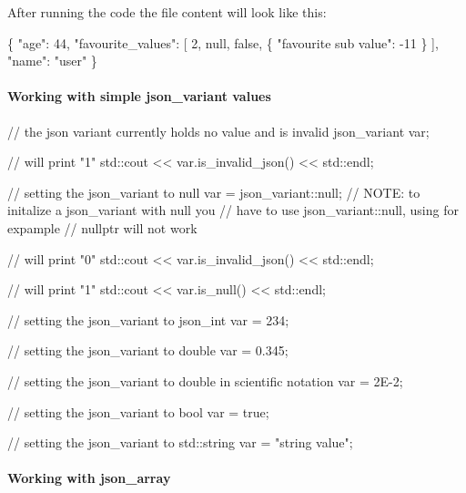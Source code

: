 After running the code the file content will look like this\+: 
\begin{DoxyCode}
\{
    "age": 44,
    "favourite\_values": [
        2,
        null,
        false,
        \{
            "favourite sub value": -11
        \}
    ],
    "name": "user"
\}
\end{DoxyCode}


\paragraph*{\label{_working_with_simple_section}%
Working with simple json\+\_\+variant values}


\begin{DoxyCode}
\textcolor{comment}{// the json variant currently holds no value and is invalid}
json\_variant var;

\textcolor{comment}{// will print "1"}
std::cout << var.is\_invalid\_json() << std::endl;    

\textcolor{comment}{// setting the json\_variant to null}
var = json\_variant::null;
\textcolor{comment}{// NOTE: to initalize a json\_variant with null you }
\textcolor{comment}{// have to use json\_variant::null, using for expample }
\textcolor{comment}{// nullptr will not work}

\textcolor{comment}{// will print "0"}
std::cout << var.is\_invalid\_json() << std::endl;

\textcolor{comment}{// will print "1"}
std::cout << var.is\_null() << std::endl;

\textcolor{comment}{// setting the json\_variant to json\_int}
var = 234;

\textcolor{comment}{// setting the json\_variant to double}
var = 0.345;

\textcolor{comment}{// setting the json\_variant to double in scientific notation}
var = 2E-2;

\textcolor{comment}{// setting the json\_variant to bool}
var = \textcolor{keyword}{true};

\textcolor{comment}{// setting the json\_variant to std::string}
var = \textcolor{stringliteral}{"string value"};       
\end{DoxyCode}


\paragraph*{\label{_working_with_json_array_section}%
Working with json\+\_\+array}

